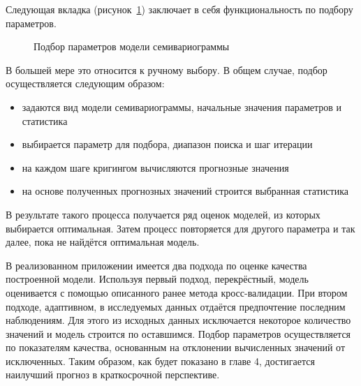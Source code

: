 Следующая вкладка (рисунок~\ref{img:mod_fit}) заключает в себя функциональность по подбору параметров.
\begin{figure}[ht]
\caption{Подбор параметров модели семивариограммы}
\label{img:mod_fit}
\end{figure}
В большей мере это относится к ручному выбору. В общем случае, подбор осуществляется следующим образом:
\begin{itemize}
	\item задаются вид модели семивариограммы, начальные значения параметров и статистика
	\item выбирается параметр для подбора, диапазон поиска и шаг итерации
	\item на каждом шаге кригингом вычисляются прогнозные значения
	\item на основе полученных прогнозных значений строится выбранная статистика
\end{itemize}
В результате такого процесса получается ряд оценок моделей, из которых выбирается оптимальная. Затем процесс повторяется для другого параметра и так далее, пока не найдётся оптимальная модель.

В реализованном приложении имеется два подхода по оценке качества построенной модели. Используя первый подход, перекрёстный, модель оценивается с помощью описанного ранее метода кросс-валидации. При втором подходе, адаптивном, в исследуемых данных отдаётся предпочтение последним наблюдениям. Для этого из исходных данных исключается некоторое количество значений и модель строится по оставшимся. Подбор параметров осуществляется по показателям качества, основанным на отклонении вычисленных значений от исключенных. Таким образом, как будет показано в главе 4, достигается наилучший прогноз в краткосрочной перспективе.

